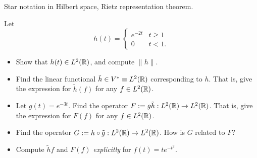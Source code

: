 \documentclass[11pt]{article}
\begin{document}
\begin{exercise}
    Star notation in Hilbert space, Rietz representation theorem.

    Let 
        \[
            h(t) = \begin{cases}
                e^{-2t} & t \geq 1 \\
                0 & t < 1.
            \end{cases}
        \]
    \begin{itemize}
        \item Show that $h(t) \in L^2(\mathbb R)$, and compute $\|h\|$.
        \item Find the linear functional $\tilde h \in V^* \equiv L^2(\mathbb R)$
        corresponding to $h$. That is, give the expression for $\tilde h(f)$ for
        any $f  \in L^2(\mathbb R)$.
        \item Let $g(t) = e^{-3t}$. Find the operator $F := g \tilde{h} :
        L^2(\mathbb R) \to L^2(\mathbb R)$. That is, give the expression for $F(f)$ for any $f
        \in L^2(\mathbb R)$.
        \item Find the operator $G := h \circ \tilde{g} : L^2(\mathbb R) \to L^2(\mathbb R)$.
        How is $G$ related to $F$?
        \item Compute $\tilde{h} f $ and $F(f)$ \emph{explicitly} for $f(t) = t e^{-t^2}$.
    \end{itemize}
\end{exercise}
\end{document}
